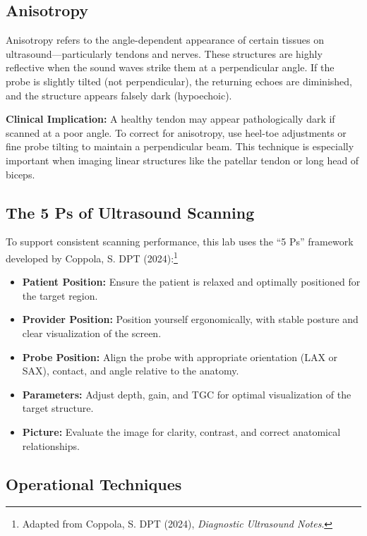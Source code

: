 \subsection*{Anisotropy}

Anisotropy refers to the angle-dependent appearance of certain tissues on ultrasound—particularly tendons and nerves. These structures are highly reflective when the sound waves strike them at a perpendicular angle. If the probe is slightly tilted (not perpendicular), the returning echoes are diminished, and the structure appears falsely dark (hypoechoic).

\textbf{Clinical Implication:} A healthy tendon may appear pathologically dark if scanned at a poor angle. To correct for anisotropy, use heel-toe adjustments or fine probe tilting to maintain a perpendicular beam. This technique is especially important when imaging linear structures like the patellar tendon or long head of biceps.

\subsection*{The 5 Ps of Ultrasound Scanning}

To support consistent scanning performance, this lab uses the “5 Ps” framework developed by Coppola, S. DPT (2024):\footnote{Adapted from Coppola, S. DPT (2024), \textit{Diagnostic Ultrasound Notes}.}

\begin{itemize}
  \item \textbf{Patient Position:} Ensure the patient is relaxed and optimally positioned for the target region.
  \item \textbf{Provider Position:} Position yourself ergonomically, with stable posture and clear visualization of the screen.
  \item \textbf{Probe Position:} Align the probe with appropriate orientation (LAX or SAX), contact, and angle relative to the anatomy.
  \item \textbf{Parameters:} Adjust depth, gain, and TGC for optimal visualization of the target structure.
  \item \textbf{Picture:} Evaluate the image for clarity, contrast, and correct anatomical relationships.
\end{itemize}

\subsection*{Operational Techniques}

